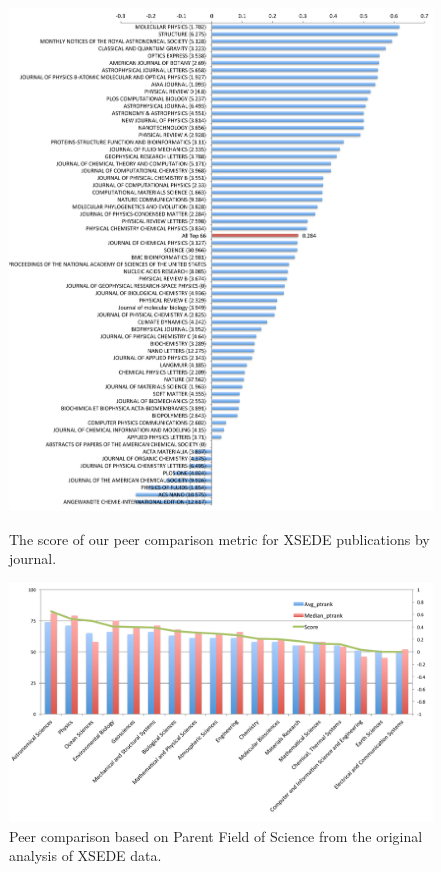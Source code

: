 \documentclass[10pt, conference, compsocconf]{IEEEtran}
\begin{document}
\begin{figure}[h!]
\includegraphics[width=.9\columnwidth]{images-new/xsede-journal-score.pdf} 
\vspace{-6pt}
\caption{The score of our peer comparison metric for XSEDE publications by journal.}\label{F:xsede-score}

  \centering 
    \includegraphics[width=1.0\columnwidth]{images-new/b.pdf} 
\vspace{-18pt}
  \caption{Peer comparison based on Parent Field of Science from the original analysis of XSEDE data.}\label{F:xsede-stacked-b} 


\end{figure}
\end{document}
